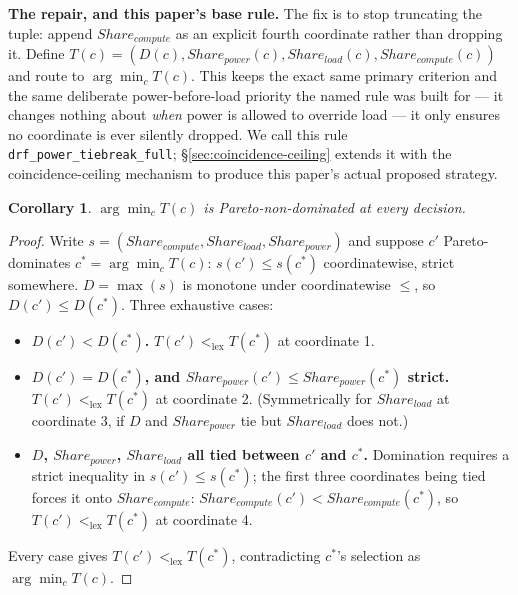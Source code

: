 \documentclass[sigconf,review,anonymous]{acmart}
\newtheorem{corollary}{Corollary}
\begin{document}
\textbf{The repair, and this paper's base rule.} The fix is to stop truncating the tuple:
append $\mathit{Share_{compute}}$ as an explicit fourth coordinate rather than dropping it.
Define $T(c) = (D(c), \mathit{Share_{power}}(c), \mathit{Share_{load}}(c),
\mathit{Share_{compute}}(c))$ and route to $\arg\min_c T(c)$. This keeps the exact same
primary criterion and the same deliberate power-before-load priority the named rule was
built for --- it changes nothing about \emph{when} power is allowed to override load --- it
only ensures no coordinate is ever silently dropped. We call this rule
\texttt{drf\_power\_tiebreak\_full}; \S\ref{sec:coincidence-ceiling} extends it with the
coincidence-ceiling mechanism to produce this paper's actual proposed strategy.



\begin{corollary}
\label{cor:tiebreak-full-safe}
$\arg\min_c T(c)$ is Pareto-non-dominated at every decision.
\end{corollary}

\begin{proof}
Write $s = (\mathit{Share_{compute}}, \mathit{Share_{load}}, \mathit{Share_{power}})$ and
suppose $c'$ Pareto-dominates $c^* = \arg\min_c T(c)$: $s(c') \le s(c^*)$ coordinatewise,
strict somewhere. $D = \max(s)$ is monotone under coordinatewise $\le$, so
$D(c') \le D(c^*)$. Three exhaustive cases:
\begin{itemize}
  \item \textbf{$D(c') < D(c^*)$.} $T(c') <_{\mathrm{lex}} T(c^*)$ at coordinate 1.
  \item \textbf{$D(c') = D(c^*)$, and $\mathit{Share_{power}}(c') \le \mathit{Share_{power}}(c^*)$
    strict.} $T(c') <_{\mathrm{lex}} T(c^*)$ at coordinate 2. (Symmetrically for
    $\mathit{Share_{load}}$ at coordinate 3, if $D$ and $\mathit{Share_{power}}$ tie but
    $\mathit{Share_{load}}$ does not.)
  \item \textbf{$D$, $\mathit{Share_{power}}$, $\mathit{Share_{load}}$ all tied between $c'$
    and $c^*$.} Domination requires a strict inequality in $s(c') \le s(c^*)$; the first
    three coordinates being tied forces it onto $\mathit{Share_{compute}}$:
    $\mathit{Share_{compute}}(c') < \mathit{Share_{compute}}(c^*)$, so
    $T(c') <_{\mathrm{lex}} T(c^*)$ at coordinate 4.
\end{itemize}
Every case gives $T(c') <_{\mathrm{lex}} T(c^*)$, contradicting $c^*$'s selection as
$\arg\min_c T(c)$.
\end{proof}
\end{document}
